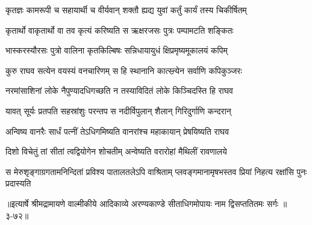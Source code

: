 \twolineshloka
{कृतज्ञः कामरूपी च सहायार्थी च वीर्यवान्}
{शक्तौ ह्यद्य युवां कर्तुं कार्यं तस्य चिकीर्षितम्} %

\twolineshloka
{कृतार्थो वाकृतार्थो वा तव कृत्यं करिष्यति}
{स ऋक्षरजसः पुत्रः पम्पामटति शङ्कितः} %

\twolineshloka
{भास्करस्यौरसः पुत्रो वालिना कृतकिल्बिषः}
{सन्निधायायुधं क्षिप्रमृष्यमूकालयं कपिम्} %

\twolineshloka
{कुरु राघव सत्येन वयस्यं वनचारिणम्}
{स हि स्थानानि कात्स्न्र्येन सर्वाणि कपिकुञ्जरः} %

\twolineshloka
{नरमांसाशिनां लोके नैपुण्यादधिगच्छति}
{न तस्याविदितं लोके किञ्चिदस्ति हि राघव} %

\twolineshloka
{यावत् सूर्यः प्रतपति सहस्रांशुः परन्तप}
{स नदीर्विपुलान् शैलान् गिरिदुर्गाणि कन्दरान्} %

\twolineshloka
{अन्विष्य वानरैः सार्धं पत्नीं तेऽधिगमिष्यति}
{वानरांश्च महाकायान् प्रेषयिष्यति राघव} %

\twolineshloka
{दिशो विचेतुं तां सीतां त्वद्वियोगेन शोचतीम्}
{अन्वेष्यति वरारोहां मैथिलीं रावणालये} %

\twolineshloka
{स मेरुशृङ्गाग्रगतामनिन्दितां प्रविश्य पातालतलेऽपि वाश्रिताम्}
{प्लवङ्गमानामृषभस्तव प्रियां निहत्य रक्षांसि पुनः प्रदास्यति} %


॥इत्यार्षे श्रीमद्रामायणे वाल्मीकीये आदिकाव्ये अरण्यकाण्डे सीताधिगमोपायः नाम द्विसप्ततितमः सर्गः ॥३-७२॥

